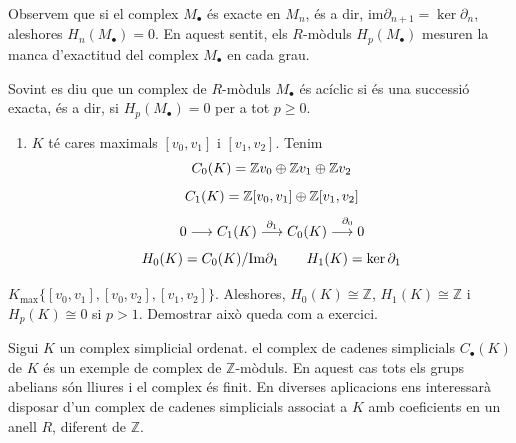 \documentclass[../main.tex]{subfiles}
\begin{document}
Observem que si el complex $M_\bullet$ és exacte en $M_n$, és a dir, $\mathrm{im}\partial_{n+1} = \ker\partial_n$, aleshores $H_n(M_\bullet) = 0$. En aquest sentit, els $R$-mòduls $H_p(M_\bullet)$ mesuren la manca d'exactitud del complex $M_\bullet$ en cada grau.

Sovint es diu que un complex de $R$-mòduls $M_\bullet$ és acíclic si és una successió exacta, és a dir, si $H_p(M_\bullet) = 0$ per a tot $p\geq 0$.


\begin{ej}
\begin{enumerate}[1)]
    \item $K$ té cares maximals $[v_0,v_1]$ i $[v_1,v_2]$. Tenim
    \begin{equation}
        \notag
        C_0(K) = \mathbb{Z}v_0\oplus\mathbb{Z}v_1\oplus\mathbb{Z}v_2
    \end{equation}
    \begin{equation}
        \notag
        C_1(K) = \mathbb{Z}[v_0,v_1]\oplus\mathbb{Z}[v_1,v_2]
    \end{equation}
    \begin{equation}
        \notag
        0\longrightarrow C_1(K)\overset{\partial_1}{\longrightarrow}C_0(K)\overset{\partial_0}{\longrightarrow 0}
    \end{equation}
    \begin{equation}
        \notag
        H_0(K) = C_0(K)/\mathrm{Im}\partial_1\qquad H_1(K) = \ker\partial_1
    \end{equation}
\end{enumerate}
\end{ej}



\begin{ej}
$K_{\max}\{[v_0,v_1],[v_0,v_2],[v_1,v_2]\}$. Aleshores, $H_0(K)\cong \mathbb{Z}$, $H_1(K)\cong\mathbb{Z}$ i $H_p(K)\cong 0$ si $p>1$. Demostrar això queda com a exercici.
\end{ej}



Sigui $K$ un complex simplicial ordenat. el complex de cadenes simplicials $C_\bullet(K)$ de $K$ és un exemple de complex de $\mathbb{Z}$-mòduls. En aquest cas tots els grups abelians són lliures i el complex és finit. En diverses aplicacions ens interessarà disposar d'un complex de cadenes simplicials associat a $K$ amb coeficients en un anell $R$, diferent de $\mathbb{Z}$.
\end{document}

